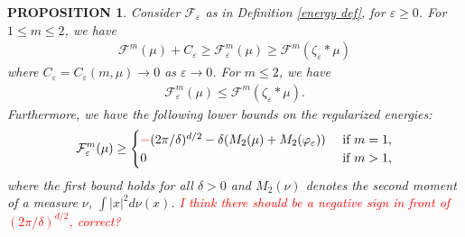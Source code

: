 \documentclass[11pt,leqno]{amsart}
\newtheorem{prop}[thm]{PROPOSITION}
\theoremstyle{definition}
\newcommand{\F}{\mathcal{F}}
\def\e{\varepsilon}
\def\F{\mathcal{F}}
\begin{document}
\begin{prop} \label{relative sizes lemma}
Consider $\F_\e$ as in Definition \ref{energy def}, for $\e \geq 0$. For $1 \leq m \leq 2$, we have
\begin{align} \label{relative sizes equation}
\F^m(\mu) + C_\e \geq \F^m_\e(\mu) \geq \F^m(\zeta_\e*\mu) 
\end{align}
where $C_\e= C_\e(m,\mu)  \to 0$ as $\e \to 0$. For $m \leq 2$, we have
\begin{align} \label{relative sizes equation 2}
 \F^m_\e(\mu) \leq \F^m(\zeta_\e*\mu) .
 \end{align}
 Furthermore, we have the following lower bounds on the regularized energies:
 \begin{align} \label{lower bounds}  \F^m_\e(\mu)  \geq  \begin{cases} \textcolor{red}{-} (2\pi/\delta)^{d/2} - \delta (M_2(\mu)+ M_2(\varphi_\e)) &\text{ if } m =1, \\ 0 &\text{ if } m>1 ,\end{cases} 
 \end{align}
 where the first bound holds for all $\delta >0$ and $M_2(\nu)$ denotes the second moment of a measure $\nu$, $\int |x|^2 d \nu(x)$. \textcolor{red}{I think there should be a negative sign in front of $(2\pi/\delta)^{d/2}$, correct?}
\end{prop}
\end{document}
